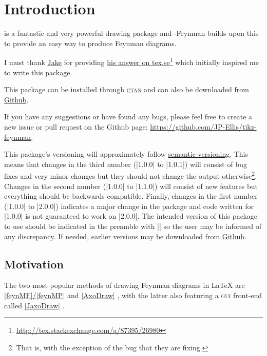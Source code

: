 \documentclass[a4paper,final]{ltxdoc}
\providecommand{\tikzfeynmanname}{\tikzname-Feynman}
\begin{document}
\section{Introduction}
\label{sec:introduction}

\href{https://www.ctan.org/pkg/pgf}{\tikzname} is a fantastic and very powerful
drawing package and \tikzfeynmanname{} builds upon this to provide an easy way
to produce Feynman diagrams.

I must thank \href{http://tex.stackexchange.com/users/2552}{Jake} for providing
\href{http://tex.stackexchange.com/a/87395/26980}{his answer on
  tex.se}\footnote{\url{http://tex.stackexchange.com/a/87395/26980}} which
initially inspired me to write this package.

This package can be installed through
\href{https://www.ctan.org/pkg/tikz-feynman}{\textsc{ctan}} and can also be
downloaded from \href{https://github.com/JP-Ellis/tikz-feynman}{Github}.

If you have any suggestions or have found any bugs, please feel free to create a
new issue or pull request on the Github page:
\url{https://github.com/JP-Ellis/tikz-feynman}.

This package's versioning will approximately follow
\href{http://semverg.org}{semantic versioning}.  This means that changes in the
third number (|1.0.0| to |1.0.1|) will consist of bug fixes and very minor
changes but they should not change the output otherwise\footnote{That is, with
  the exception of the bug that they are fixing.}.  Changes in the second number
(|1.0.0| to |1.1.0|) will consist of new features but everything should be
backwards compatible.  Finally, changes in the first number (|1.0.0| to |2.0.0|)
indicates a major change in the package and code written for |1.0.0| is not
guaranteed to work on |2.0.0|.  The intended version of this package to use
should be indicated in the preamble with || so the
user may be informed of any discrepancy.  If needed, earlier versions may be
downloaded from \href{http://github.com/JP-Ellis/tikz-feynman/releases}{Github}.

\subsection*{Motivation}
\label{subsec:motivation}

The two most popular methods of drawing Feynman diagrams in \LaTeX{} are
\href{https://www.ctan.org/pkg/feynmf}{|feynMF|/|feynMP|} \cite{feynmf} and
\href{https://www.ctan.org/pkg/axodraw}{|AxoDraw|} \cite{axodraw}, with the
latter also featuring a \textsc{gui} front-end called
\href{http://jaxodraw.sourceforge.net}{|JaxoDraw|} \cite{jaxodrawV1,jaxodrawV2}.
\end{document}
